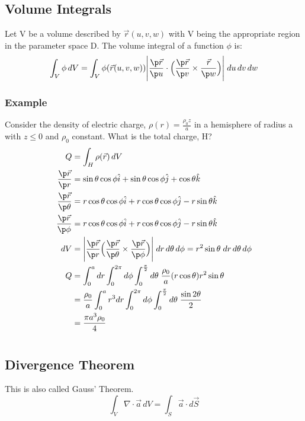 \documentclass[a4paper, 11pt, normalem]{report}
\begin{document}
\section{Volume Integrals}
Let V be a volume described by $\vec{r}(u, v, w)$ with V being the appropriate region in the parameter space D.
The volume integral of a function $\phi$ is:
\begin{equation*}
    \int_V \phi\,dV = \int_V \phi(\vec{r}(u, v, w)) \Bigg| \frac{\p \vec{r}}{\p u} \cdot \Big(\frac{\p \vec{r}}{\p v} \times \frac{\vec{r}}{\p w}\Big)\Bigg|\;du\,dv\,dw
\end{equation*}

\subsection{Example}
Consider the density of electric charge, $\rho(r) = \frac{\rho_0 z}{a}$ in a hemisphere of radius a with $z \leq 0$ and $\rho_0$ constant.
What is the total charge, H?
\begin{align*}
    Q &= \int_H \rho(\vec{r})\,dV \\
    \frac{\p \vec{r}}{\p r} &= \sin\theta\cos\phi \hat{i} + \sin\theta\cos\phi \hat{j} + \cos\theta \hat{k} \\
    \frac{\p \vec{r}}{\p \theta} &= r\cos\theta\cos\phi \hat{i} + r\cos\theta\cos\phi \hat{j} - r\sin\theta \hat{k} \\
    \frac{\p \vec{r}}{\p \phi} &= r\cos\theta\cos\phi \hat{i} + r\cos\theta\cos\phi \hat{j} - r\sin\theta\hat{k} \\
    dV &= \Bigg| \frac{\p \vec{r}}{\p r} \Big(\frac{\p \vec{r}}{\p \theta} \times \frac{\p \vec{r}}{\p \phi}\Big)\Bigg|\;dr\,d\theta\,d\phi = r^2 \sin\theta \;dr\,d\theta\,d\phi \\
    Q &= \int_{0}^a dr \int_0^{2\pi} d\phi \int_{0}^{\frac{\pi}{2}} d\theta\; \frac{\rho_0}{a} (r\cos\theta)r^2\sin\theta \\
    &= \frac{\rho_0}{a} \int_0^a r^3 dr \int_0^{2\pi} d\phi \int_{0}^{\frac{\pi}{2}} d\theta\; \frac{\sin 2\theta}{2} \\
    &= \frac{\pi a^3 \rho_0}{4}
\end{align*}


\chapter{}
\section{Divergence Theorem}
This is also called Gauss' Theorem.
\begin{equation*}
    \int_V \nabla \cdot \vec{a}\,dV = \int_S \vec{a}\cdot d\vec{S}
\end{equation*}
\end{document}
